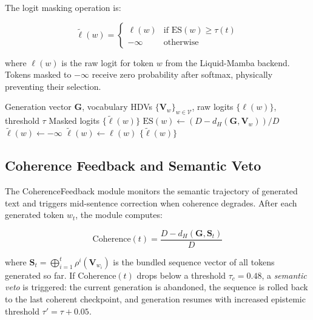 \documentclass[12pt,a4paper]{article}
\begin{document}
The logit masking operation is:

\begin{equation}
\tilde{\ell}(w) = \begin{cases}
\ell(w) & \text{if } \text{ES}(w) \geq \tau(t) \\
-\infty & \text{otherwise}
\end{cases}
\label{eq:masking}
\end{equation}

where $\ell(w)$ is the raw logit for token $w$ from the Liquid-Mamba backend. Tokens masked to $-\infty$ receive zero probability after softmax, physically preventing their selection.

\begin{algorithm}[H]
\caption{Epistemic Gating for Token Generation}
\label{alg:epistemic-gate}
\begin{algorithmic}[1]
\REQUIRE Generation vector $\mathbf{G}$, vocabulary HDVs $\{\mathbf{V}_w\}_{w \in \mathcal{V}}$, raw logits $\{\ell(w)\}$, threshold $\tau$
\ENSURE Masked logits $\{\tilde{\ell}(w)\}$
    \STATE $\text{ES}(w) \leftarrow (D - d_H(\mathbf{G}, \mathbf{V}_w)) / D$
        \STATE $\tilde{\ell}(w) \leftarrow -\infty$
    \ELSE
        \STATE $\tilde{\ell}(w) \leftarrow \ell(w)$
    \ENDIF
\ENDFOR
\RETURN $\{\tilde{\ell}(w)\}$
\end{algorithmic}
\end{algorithm}

\subsection{Coherence Feedback and Semantic Veto}

The CoherenceFeedback module monitors the semantic trajectory of generated text and triggers mid-sentence correction when coherence degrades. After each generated token $w_t$, the module computes:

\begin{equation}
\text{Coherence}(t) = \frac{D - d_H(\mathbf{G}, \mathbf{S}_t)}{D}
\end{equation}

where $\mathbf{S}_t = \bigoplus_{i=1}^{t} \rho^i(\mathbf{V}_{w_i})$ is the bundled sequence vector of all tokens generated so far. If $\text{Coherence}(t)$ drops below a threshold $\tau_c = 0.48$, a \emph{semantic veto} is triggered: the current generation is abandoned, the sequence is rolled back to the last coherent checkpoint, and generation resumes with increased epistemic threshold $\tau' = \tau + 0.05$.
\end{document}
